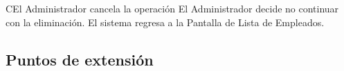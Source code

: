 \begin{UCtrayectoriaA}{C}{El Administrador cancela la operación}
	\UCpaso El Administrador decide no continuar con la eliminación.
	\UCpaso El sistema regresa a la Pantalla de Lista de Empleados.
\end{UCtrayectoriaA}

\subsection{Puntos de extensión}


